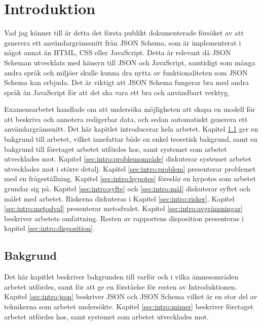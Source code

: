\chapter{Introduktion}
Vad jag känner till är detta det första publikt dokumenterade försöket av att generera ett användargränssnitt från JSON Schema, som är implementerat i något annat än HTML, CSS eller JavaScript. Detta är relevant då JSON Scheman utvecklats med hänsyn till JSON och JavaScript, samtidigt som många andra språk och miljöer skulle kunna dra nytta av funktionaliteten som JSON Schema kan erbjuda. Det är viktigt att JSON Schema fungerar bra med andra språk än JavaScript för att det ska vara ett bra och användbart verktyg.

Examensarbetet handlade om att undersöka möjligheten att skapa en modell för att beskriva och annotera redigerbar data, och sedan automatiskt generera ett användargränssnitt. Det här kapitlet introducerar hela arbetet. Kapitel \ref{sec:intro:bakgrund} ger en bakgrund till arbetet, vilket innefattar både en enkel teoretisk bakgrund, samt en bakgrund till företaget arbetet utfördes hos, samt systemet som arbetet utvecklades mot. Kapitel \ref{sec:intro:problemområde} diskuterar systemet arbetet utvecklades mot i större detalj. Kapitel \ref{sec:intro:problem} presenterar problemet med en frågeställning. Kapitel \ref{sec:intro:hypotes} föreslår en hypotes som arbetet grundar sig på. Kapitel \ref{sec:intro:syfte} och \ref{sec:intro:mål} diskuterar syftet och målet med arbetet. Riskerna diskuteras i Kapitel \ref{sec:intro:risker}. Kapitel \ref{sec:intro:metodval} presenterar metodvalet. Kapitel \ref{sec:intro:avgränsningar} beskriver arbetets omfattning. Resten av rapportens disposition presenteras i kapitel \ref{sec:intro:disposition}.

\section{Bakgrund}
\label{sec:intro:bakgrund}
Det här kapitlet beskriver bakgrunden till varför och i vilka ämnesområden arbetet utfördes, samt för att ge en förståelse för resten av Introduktionen. Kapitel \ref{sec:intro:json} beskriver JSON och JSON Schema vilket är en stor del av teknikerna som arbetet undersökte. Kapitel \ref{sec:intro:mimer} beskriver företaget arbetet utfördes hos, samt systemet som arbetet utvecklades mot.

